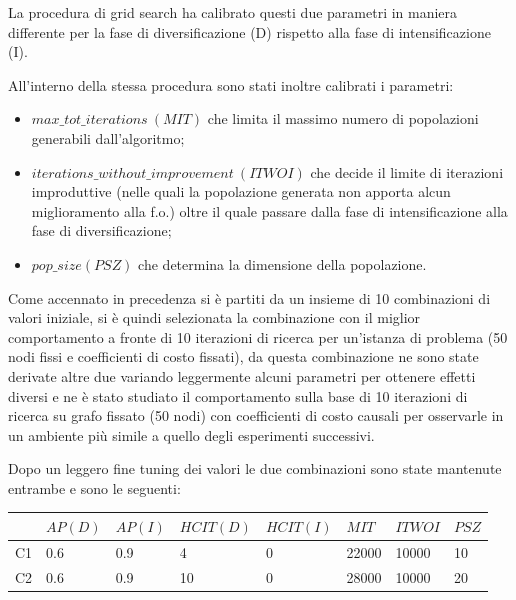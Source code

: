 \documentclass[a4paper]{article}
\begin{document}
            La procedura di grid search ha calibrato questi due parametri in maniera differente per la fase di diversificazione (D) rispetto alla fase di intensificazione (I).

            All'interno della stessa procedura sono stati inoltre calibrati i parametri:
            \begin{itemize}
                \item $max\_tot\_iterations\ (MIT)$ che limita il massimo numero di popolazioni generabili dall'algoritmo;
                \item $iterations\_without\_improvement\ (ITWOI)$ che decide il limite di iterazioni improduttive (nelle quali la popolazione generata non apporta alcun miglioramento alla f.o.)
                    oltre il quale passare dalla fase di intensificazione alla fase di diversificazione;
                \item $pop\_size (PSZ)$ che determina la dimensione della popolazione.
            \end{itemize}

            Come accennato in precedenza si \`e partiti da un insieme di 10 combinazioni di valori iniziale, si \`e quindi selezionata la combinazione con il miglior comportamento a fronte di 10 iterazioni
            di ricerca per un'istanza di problema (50 nodi fissi e coefficienti di costo fissati), da questa combinazione ne sono state derivate altre due variando leggermente alcuni parametri
            per ottenere effetti diversi e ne \`e stato studiato il comportamento sulla base di 10 iterazioni di ricerca su grafo fissato (50 nodi) con coefficienti di costo causali per osservarle
            in un ambiente pi\`u simile a quello degli esperimenti successivi.

            Dopo un leggero fine tuning dei valori le due combinazioni sono state mantenute entrambe e sono le seguenti:

            \begin{center}
                \begin{tabular}{|l|l|l|l|l|l|l|l|}  \hline
                    & $AP (D)$ & $AP (I)$ & $HCIT (D)$ & $HCIT (I)$ & $MIT$ & $ITWOI$ & $PSZ$ \\ \hline

                    C1 & 0.6        & 0.9        & 4       & 0           & 22000           & 10000            & 10    \\ \hline

                    C2 & 0.6        & 0.9        & 10       & 0           & 28000           & 10000            & 20    \\ \hline 
                \end{tabular}
            \end{center}
\end{document}
